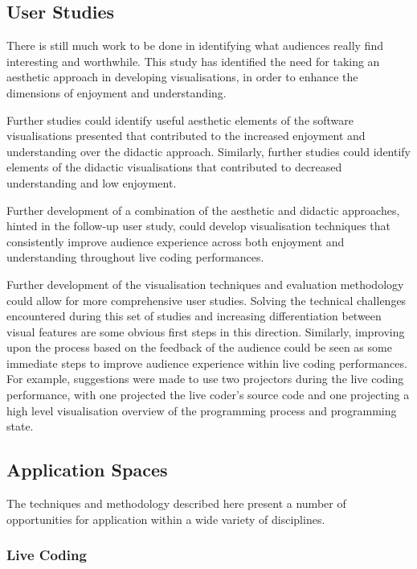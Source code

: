 \subsection{User Studies}

There is still much work to be done in identifying what audiences really find interesting and worthwhile. This study has identified the need for taking an aesthetic approach in developing visualisations, in order to enhance the dimensions of enjoyment and understanding.

Further studies could identify useful aesthetic elements of the software visualisations presented that contributed to the increased enjoyment and understanding over the didactic approach. Similarly, further studies could identify elements of the didactic visualisations that contributed to decreased understanding and low enjoyment.

Further development of a combination of the aesthetic and didactic approaches, hinted in the follow-up user study, could develop visualisation techniques that consistently improve audience experience across both enjoyment and understanding throughout live coding performances.

Further development of the visualisation techniques and evaluation methodology could allow for more comprehensive user studies. Solving the technical challenges encountered during this set of studies and increasing differentiation between visual features are some obvious first steps in this direction. Similarly, improving upon the process based on the feedback of the audience could be seen as some immediate steps to improve audience experience within live coding performances. For example, suggestions were made to use two projectors during the live coding performance, with one projected the live coder's source code and one projecting a high level visualisation overview of the programming process and programming state.

\subsection{Application Spaces}

The techniques and methodology described here present a number of opportunities for application within a wide variety of disciplines.

\subsubsection{Live Coding}

